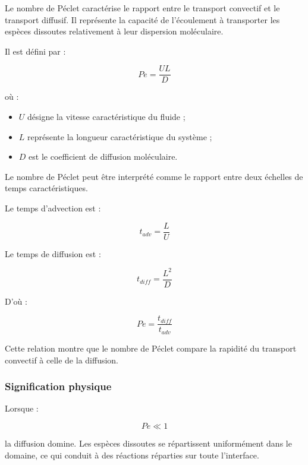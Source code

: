\documentclass[12pt,a4paper]{report}
\begin{document}
Le nombre de Péclet caractérise le rapport entre le transport convectif et le transport diffusif. Il représente la capacité de l’écoulement à transporter les espèces dissoutes relativement à leur dispersion moléculaire.

Il est défini par :

\begin{equation}
Pe
=
\frac{UL}{D}
\end{equation}

où :

\begin{itemize}
\item $U$ désigne la vitesse caractéristique du fluide ;
\item $L$ représente la longueur caractéristique du système ;
\item $D$ est le coefficient de diffusion moléculaire.
\end{itemize}

Le nombre de Péclet peut être interprété comme le rapport entre deux échelles de temps caractéristiques.

Le temps d’advection est :

\begin{equation}
t_{adv}
=
\frac{L}{U}
\end{equation}

Le temps de diffusion est :

\begin{equation}
t_{diff}
=
\frac{L^2}{D}
\end{equation}

D’où :

\begin{equation}
Pe
=
\frac{t_{diff}}{t_{adv}}
\end{equation}

Cette relation montre que le nombre de Péclet compare la rapidité du transport convectif à celle de la diffusion.

\subsubsection{Signification physique}

Lorsque :

\begin{equation}
Pe \ll 1
\end{equation}

la diffusion domine. Les espèces dissoutes se répartissent uniformément dans le domaine, ce qui conduit à des réactions réparties sur toute l’interface.
\end{document}
